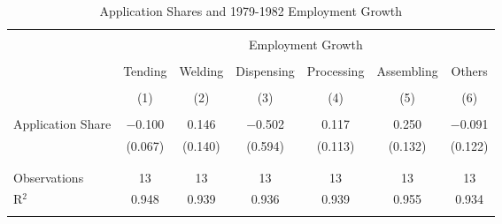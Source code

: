 
\begin{table}[!t] \centering 
  \caption{Application Shares and 1979-1982 Employment Growth} 
  \label{initial_share_correlates_pretrend} 
\begin{tabular}{@{\extracolsep{5pt}}lcccccc} 
\\[-1.8ex]\hline 
\hline \\[-1.8ex] 
 & \multicolumn{6}{c}{Employment Growth} \\ 
\cline{2-7} 
\\[-1.8ex] & Tending & Welding & Dispensing & Processing & Assembling & Others \\ 
\\[-1.8ex] & (1) & (2) & (3) & (4) & (5) & (6)\\ 
\hline \\[-1.8ex] 
 Application Share & $-$0.100 & 0.146 & $-$0.502 & 0.117 & 0.250 & $-$0.091 \\ 
  & (0.067) & (0.140) & (0.594) & (0.113) & (0.132) & (0.122) \\ 
  & & & & & & \\ 
\hline \\[-1.8ex] 
Observations & 13 & 13 & 13 & 13 & 13 & 13 \\ 
R$^{2}$ & 0.948 & 0.939 & 0.936 & 0.939 & 0.955 & 0.934 \\ 
\hline 
\hline \\[-1.8ex] 
\end{tabular} 
\end{table} 
